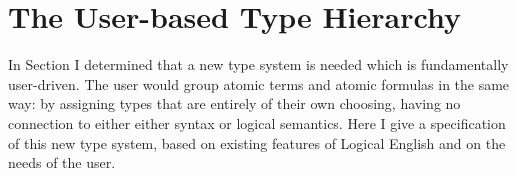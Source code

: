 \documentclass[../main.tex]{subfiles}
\begin{document}

\section{The User-based Type Hierarchy}
\label{section:type-hierarchy}
In Section \cite{section:type-system-review} I determined that a new type system is needed which is fundamentally user-driven. The user would group atomic terms and atomic formulas in the same way: by assigning types that are entirely of their own choosing, having no connection to either either syntax or logical semantics. Here I give a specification of this new type system, based on existing features of Logical English and on the needs of the user.
\end{document}
